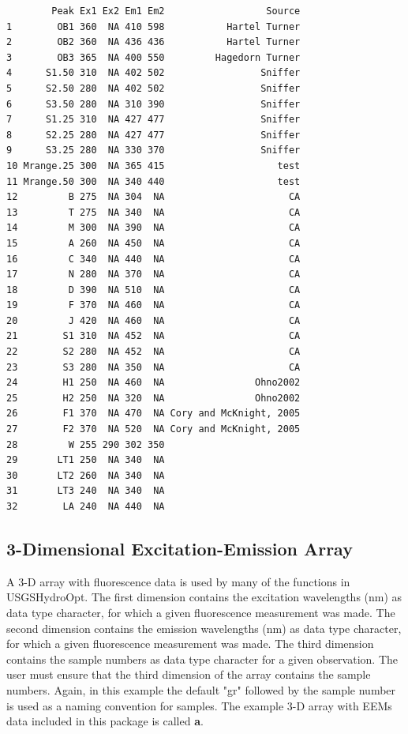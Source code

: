 \documentclass[a4paper,11pt]{article}\usepackage[]{graphicx}\usepackage[]{color}
\makeatletter
\newenvironment{kframe}{%
 \def\at@end@of@kframe{}%
 \ifinner\ifhmode%
  \def\at@end@of@kframe{\end{minipage}}%
  \begin{minipage}{\columnwidth}%
 \fi\fi%
 \def\FrameCommand##1{\hskip\@totalleftmargin \hskip-\fboxsep
 \colorbox{shadecolor}{##1}\hskip-\fboxsep
     \hskip-\linewidth \hskip-\@totalleftmargin \hskip\columnwidth}%
 \MakeFramed {\advance\hsize-\width
   \@totalleftmargin\z@ \linewidth\hsize
   \@setminipage}}%
 {\par\unskip\endMakeFramed%
 \at@end@of@kframe}
\newenvironment{knitrout}{}{} %
\makeatother
\begin{document}
\begin{knitrout}
\color{fgcolor}\begin{kframe}
\begin{verbatim}
        Peak Ex1 Ex2 Em1 Em2                  Source
1        OB1 360  NA 410 598           Hartel Turner
2        OB2 360  NA 436 436           Hartel Turner
3        OB3 365  NA 400 550         Hagedorn Turner
4      S1.50 310  NA 402 502                 Sniffer
5      S2.50 280  NA 402 502                 Sniffer
6      S3.50 280  NA 310 390                 Sniffer
7      S1.25 310  NA 427 477                 Sniffer
8      S2.25 280  NA 427 477                 Sniffer
9      S3.25 280  NA 330 370                 Sniffer
10 Mrange.25 300  NA 365 415                    test
11 Mrange.50 300  NA 340 440                    test
12         B 275  NA 304  NA                      CA
13         T 275  NA 340  NA                      CA
14         M 300  NA 390  NA                      CA
15         A 260  NA 450  NA                      CA
16         C 340  NA 440  NA                      CA
17         N 280  NA 370  NA                      CA
18         D 390  NA 510  NA                      CA
19         F 370  NA 460  NA                      CA
20         J 420  NA 460  NA                      CA
21        S1 310  NA 452  NA                      CA
22        S2 280  NA 452  NA                      CA
23        S3 280  NA 350  NA                      CA
24        H1 250  NA 460  NA                Ohno2002
25        H2 250  NA 320  NA                Ohno2002
26        F1 370  NA 470  NA Cory and McKnight, 2005
27        F2 370  NA 520  NA Cory and McKnight, 2005
28         W 255 290 302 350                        
29       LT1 250  NA 340  NA                        
30       LT2 260  NA 340  NA                        
31       LT3 240  NA 340  NA                        
32        LA 240  NA 440  NA                        
\end{verbatim}
\end{kframe}
\end{knitrout}

\subsection{3-Dimensional Excitation-Emission Array}
A 3-D array with fluorescence data is used by many of the functions in USGSHydroOpt. The first dimension contains the excitation wavelengths (nm) as data type character, for which a given fluorescence measurement was made. The second dimension contains the emission wavelengths (nm) as data type character, for which a given fluorescence measurement was made. The third dimension contains the sample numbers as data type character for a given observation. The user must ensure that the third dimension of the array contains the sample numbers. Again, in this example the default "gr" followed by the sample number is used as a naming convention for samples. The example 3-D array with EEMs data included in this package is called \textbf{a}.
\end{document}
